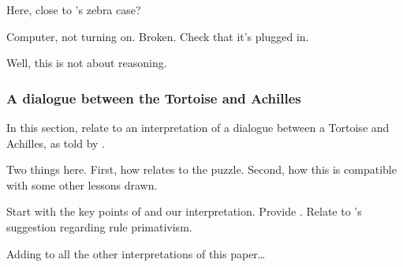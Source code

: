 \begin{note}
  Here, close to \citeauthor{Dretske:1970to}'s zebra case?
\end{note}

\begin{note}
  \begin{illustration}
    Computer, not turning on.
    Broken.
    Check that it's plugged in.
  \end{illustration}

  Well, this is not about reasoning.
\end{note}

\subsubsection[The Tortoise and Achilles]{A dialogue between the Tortoise and Achilles}
\label{cha:zS:sec:question:illu:carroll}

\begin{note}
  In this section, relate \qzS{} to an interpretation of a dialogue between a Tortoise and Achilles, as told by \textcite{Carroll:1895uj}.

  Two things here.
  First, how \qzS{} relates to the puzzle.
  Second, how this is compatible with some other lessons drawn.

  Start with the key points of \textcite{Carroll:1895uj} and our interpretation.
  Provide .
  Relate to \citeauthor{Boghossian:2008vf}'s suggestion regarding rule primativism.
\end{note}

\begin{note}
  \color{red}
  Adding to all the other interpretations of this paper\dots
\end{note}

